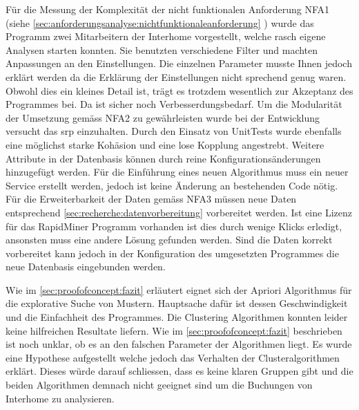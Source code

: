 Für die Messung der Komplexität der nicht funktionalen Anforderung NFA1 (siehe \cref{sec:anforderungsanalyse:nichtfunktionaleanforderung} ) wurde das Programm zwei Mitarbeitern der Interhome vorgestellt, welche rasch eigene Analysen starten konnten. Sie benutzten verschiedene Filter und machten Anpassungen an den Einstellungen. Die einzelnen Parameter musste Ihnen jedoch erklärt werden da die Erklärung der Einstellungen nicht sprechend genug waren. Obwohl dies ein kleines Detail ist, trägt es trotzdem wesentlich zur Akzeptanz des Programmes bei. Da ist sicher noch Verbesserdungsbedarf. Um die Modularität der Umsetzung gemäss NFA2 zu gewährleisten wurde bei der Entwicklung versucht das \gls{srp} einzuhalten. Durch den Einsatz von UnitTests wurde ebenfalls eine möglichst starke Kohäsion und eine lose Kopplung angestrebt. Weitere Attribute in der Datenbasis können durch reine Konfigurationsänderungen hinzugefügt werden. Für die Einführung eines neuen Algorithmus muss ein neuer Service erstellt werden, jedoch ist keine Änderung an bestehenden Code nötig. Für die Erweiterbarkeit der Daten gemäss NFA3 müssen neue Daten entsprechend \cref{sec:recherche:datenvorbereitung}  vorbereitet werden. Ist eine Lizenz für das RapidMiner Programm vorhanden ist dies durch wenige Klicks erledigt, ansonsten muss eine andere Lösung gefunden werden. Sind die Daten korrekt vorbereitet kann jedoch in der Konfiguration des umgesetzten Programmes die neue Datenbasis eingebunden werden. 

Wie im \cref{sec:proofofconcept:fazit}  erläutert eignet sich der Apriori Algorithmus für die explorative Suche von Mustern. Hauptsache dafür ist dessen Geschwindigkeit und die Einfachheit des Programmes. Die Clustering Algorithmen konnten leider keine hilfreichen Resultate liefern. Wie im \cref{sec:proofofconcept:fazit}  beschrieben ist noch unklar, ob es an den falschen Parameter der Algorithmen liegt. Es wurde eine Hypothese aufgestellt welche jedoch das Verhalten der Clusteralgorithmen erklärt. Dieses würde darauf schliessen, dass es keine klaren Gruppen gibt und die beiden Algorithmen demnach nicht geeignet sind um die Buchungen von Interhome zu analysieren.


%
%
%
%

